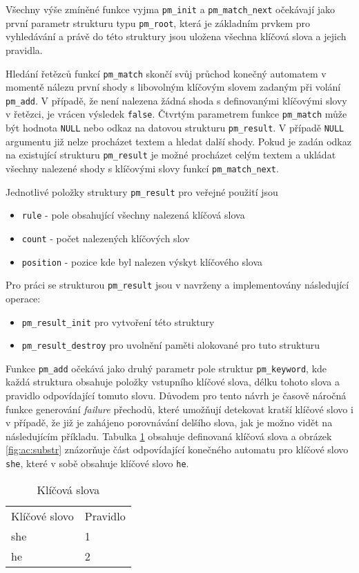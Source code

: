 Všechny výše zmíněné funkce vyjma \texttt{pm\_init} a \texttt{pm\_match\_next} očekávají jako první parametr strukturu typu \texttt{pm\_root},
která je základním prvkem pro vyhledávání a právě do této struktury
jsou uložena všechna klíčová slova a jejich pravidla.

Hledání řetězců funkcí \texttt{pm\_match} skončí svůj průchod konečný automatem v momentě nálezu první shody
s libovolným klíčovým slovem zadaným při volání \texttt{pm\_add}.
V případě, že není nalezena žádná shoda
s definovanými klíčovými slovy v řetězci, je vrácen výsledek \texttt{false}.
Čtvrtým parametrem funkce \texttt{pm\_match} může být hodnota \texttt{NULL} nebo odkaz na datovou strukturu
\texttt{pm\_result}. V případě \texttt{NULL} argumentu již nelze procházet textem a hledat další shody.
Pokud je zadán odkaz na existující strukturu \texttt{pm\_result} je možné procházet celým textem a ukládat
všechny nalezené shody s klíčovými slovy funkcí \texttt{pm\_match\_next}.

Jednotlivé položky struktury \texttt{pm\_result} pro veřejné použití jsou

\begin{itemize}
    \item{\texttt{rule} - pole obsahující všechny nalezená klíčová slova}
    \item{\texttt{count} - počet nalezených klíčových slov}
    \item{\texttt{position} - pozice kde byl nalezen výskyt klíčového slova}
\end{itemize}

Pro práci se strukturou \texttt{pm\_result} jsou v navrženy a implementovány následující operace:

\begin{itemize}
    \item{\texttt{pm\_result\_init} pro vytvoření této struktury}
    \item{\texttt{pm\_result\_destroy} pro uvolnění paměti alokované pro tuto strukturu}
\end{itemize}


Funkce \texttt{pm\_add} očekává jako druhý parametr pole struktur \texttt{pm\_keyword}, kde každá struktura
obsahuje položky vstupního klíčové slova, délku tohoto slova a pravidlo odpovídající tomuto slovu. Důvodem pro tento návrh je časově náročná funkce generování
\textit{failure} přechodů, které umožňují detekovat kratší klíčové slovo i v případě, že již je
zahájeno porovnávání delšího slova, jak je možno vidět na následujícím příkladu. Tabulka \ref{tab:ac:substr}
obsahuje definovaná klíčová slova a obrázek \ref{fig:ac:substr} znázorňuje část odpovídající konečného automatu
pro klíčové slovo \texttt{she}, které v sobě obsahuje klíčové slovo \texttt{he}.
\begin{table}[!htbp]
    \center
    \begin{tabular}{|l|l|}
    \hline
    Klíčové slovo & Pravidlo \\ \hhline{|=|=|}
    she & 1  \\ \hline
    he & 2 \\ \hline
    \end{tabular}
    \caption{Klíčová slova}
    \label{tab:ac:substr}
\end{table}

